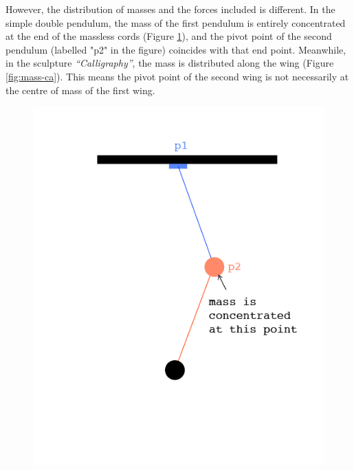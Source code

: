 \documentclass[a4paper,12pt]{article}
\begin{document}
However, the distribution of masses and the forces included is different. In the simple double pendulum, the mass of the first pendulum is entirely concentrated at the end of the massless cords (Figure \ref{fig:mass-db}), and the pivot point of the second pendulum (labelled "p2" in the figure) coincides with that end point. Meanwhile, in the sculpture \textit{“Calligraphy”}, the mass is distributed along the wing (Figure \ref{fig:mass-ca}). This means the pivot point of the second wing is not necessarily at the centre of mass of the first wing.
\begin{figure}[H]
    \centering
    \begin{minipage}{0.45\textwidth}
        \centering
        \includegraphics[width=.9\textwidth]{dif_labelled_double_pendulum}
        \caption{}
        \label{fig:mass-db}
    \end{minipage}\hfill
    \begin{minipage}{0.45\textwidth}
        \centering

\end{minipage}
\end{figure}
\end{document}
